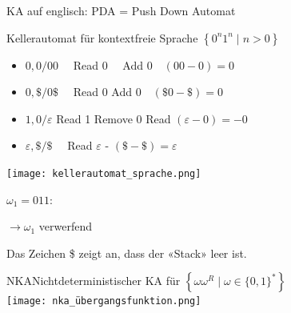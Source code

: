 \begin{remark}
    KA auf englisch: PDA = Push Down Automat
\end{remark}

\begin{KR}{Kellerautomat für kontextfreie Sprache} $\left\{0^{n} 1^{n} \mid n>0\right\}$
    \begin{itemize}
    \item $0,0 / 00 \quad$ Read $0 \quad$ Add $0 \quad(00-0)=0$
    \item $0, \$ / 0 \$ \quad$ Read 0 Add $0 \quad(\$ 0-\$)=0$
    \item $1,0 / \varepsilon$ Read 1 Remove 0 Read $(\varepsilon-0)=-0$
    \item $\varepsilon, \$ / \$ \quad$ Read $\varepsilon$ - $(\$-\$)=\varepsilon$
    \end{itemize}

    \begin{minipage}{0.5\linewidth}
        \texttt{[image: kellerautomat\_sprache.png]}
    \end{minipage}
    \begin{minipage}{0.5\linewidth}
        $\omega_{1}=011:$

        $\rightarrow \omega_{1}$ verwerfend 
        
        Das Zeichen \$ zeigt an, dass der «Stack» leer ist.
    \end{minipage}
\end{KR}

\begin{concept}{NKA}Nichtdeterministischer KA für $\left\{\omega \omega^{R} \mid \omega \in\{0,1\}^{*}\right\}$\\
    
    \texttt{[image: nka\_übergangsfunktion.png]}
\end{concept}

